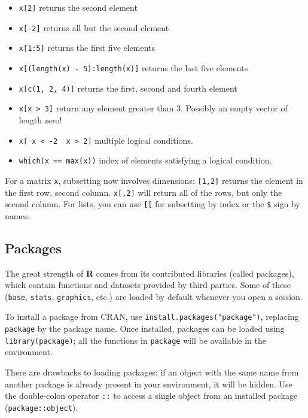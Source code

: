 \documentclass[]{book}
\providecommand{\tightlist}{%
  \setlength{\itemsep}{0pt}\setlength{\parskip}{0pt}}
\theoremstyle{definition}
\theoremstyle{definition}
\theoremstyle{definition}
\theoremstyle{remark}
\let\BeginKnitrBlock\begin \let\EndKnitrBlock\end
\begin{document}
\begin{itemize}
\tightlist
\item
  \texttt{x{[}2{]}} returns the second element
\item
  \texttt{x{[}-2{]}} returns all but the second element
\item
  \texttt{x{[}1:5{]}} returns the first five elements
\item
  \texttt{x{[}(length(x)\ -\ 5):length(x){]}} returns the last five
  elements
\item
  \texttt{x{[}c(1,\ 2,\ 4){]}} returns the first, second and fourth
  element
\item
  \texttt{x{[}x\ \textgreater{}\ 3{]}} return any element greater than
  3. Possibly an empty vector of length zero!
\item
  \texttt{x{[}\ x\ \textless{}\ -2\ \textbar{}\ x\ \textgreater{}\ 2{]}}
  multiple logical conditions.
\item
  \texttt{which(x\ ==\ max(x))} index of elements satisfying a logical
  condition.
\end{itemize}

For a matrix \texttt{x}, subsetting now involves dimensions:
\texttt{{[}1,2{]}} returns the element in the first row, second column.
\texttt{x{[},2{]}} will return all of the rows, but only the second
column. For lists, you can use \texttt{{[}{[}} for subsetting by index
or the \texttt{\$} sign by names.

\subsection{Packages}\label{packages}

The great strength of \textbf{R} comes from its contributed libraries
(called packages), which contain functions and datasets provided by
third parties. Some of these (\texttt{base}, \texttt{stats},
\texttt{graphics}, etc.) are loaded by default whenever you open a
session.

To install a package from CRAN, use
\texttt{install.packages("package")}, replacing \texttt{package} by the
package name. Once installed, packages can be loaded using
\texttt{library(package)}; all the functions in \texttt{package} will be
available in the environment.

\BeginKnitrBlock{rmdcaution}
There are drawbacks to loading packages: if an object with the same name
from another package is already present in your environment, it will be
hidden. Use the double-colon operator \texttt{::} to access a single
object from an installed package (\texttt{package::object}).
\EndKnitrBlock{rmdcaution}
\end{document}
